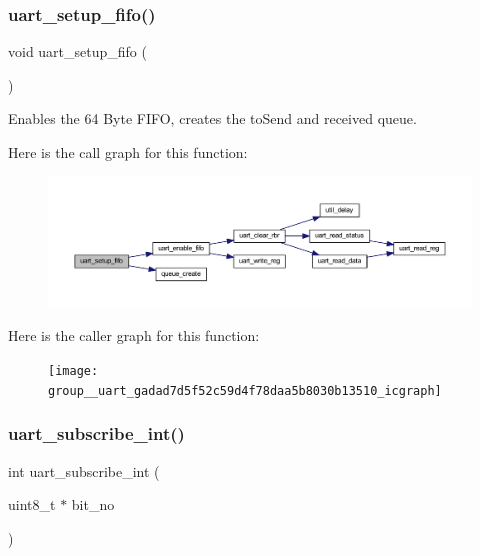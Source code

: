 \subsubsection{\texorpdfstring{uart\+\_\+setup\+\_\+fifo()}{uart\_setup\_fifo()}}
{\footnotesize\ttfamily void uart\+\_\+setup\+\_\+fifo (\begin{DoxyParamCaption}{ }\end{DoxyParamCaption})}



Enables the 64 Byte F\+I\+FO, creates the to\+Send and received queue. 

Here is the call graph for this function\+:\nopagebreak
\begin{figure}[H]
\begin{center}
\leavevmode
\includegraphics[width=350pt]{group__uart_gadad7d5f52c59d4f78daa5b8030b13510_cgraph}
\end{center}
\end{figure}
Here is the caller graph for this function\+:\nopagebreak
\begin{figure}[H]
\begin{center}
\leavevmode
\texttt{[image: group\_\_uart\_gadad7d5f52c59d4f78daa5b8030b13510\_icgraph]}
\end{center}
\end{figure}
\mbox{\label{group__uart_gac0d5ac077c28fa582ed60b1c3d977d83}} 
\subsubsection{\texorpdfstring{uart\+\_\+subscribe\+\_\+int()}{uart\_subscribe\_int()}}
{\footnotesize\ttfamily int uart\+\_\+subscribe\+\_\+int (\begin{DoxyParamCaption}\item[{uint8\+\_\+t $\ast$}]{bit\+\_\+no }\end{DoxyParamCaption})}



